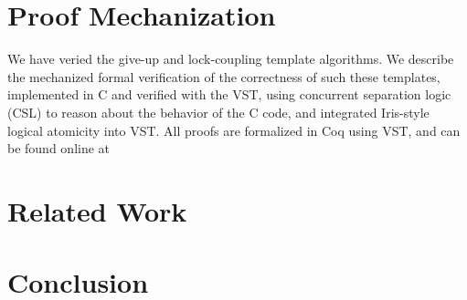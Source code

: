 \documentclass[a4paper,UKenglish,cleveref, autoref, thm-restate]{lipics-v2021}
\begin{document}
\section{Proof Mechanization}
We have veried the give-up and lock-coupling template algorithms.
We describe the mechanized formal verification of the correctness of such these templates, implemented in C and verified with the VST, using concurrent separation
logic (CSL) to reason about the behavior of the C code, and integrated Iris-style logical atomicity into VST. All proofs are formalized in Coq using VST, and can be found online at 


\href{https://github.com/PrincetonUniversity/DeepSpecDB/tree/master/concurrency/templates}{\color{blue}{https://github.com/PrincetonUniversity/DeepSpecDB/tree/master/concurrency/templates}}




\section{Related Work}

\section{Conclusion}







\end{document}
